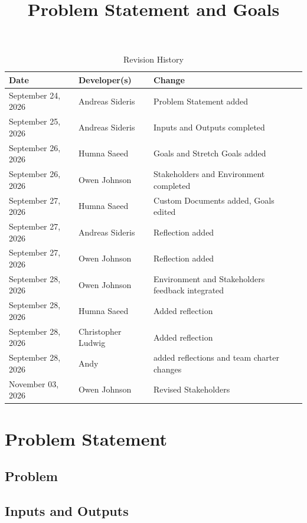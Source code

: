 \documentclass{article}
\title{Problem Statement and Goals\\\progname}
\author{\authname}
\date{}
\begin{document}
\maketitle

\begin{table}[hp]
\caption{Revision History} \label{TblRevisionHistory}
\begin{tabularx}{\textwidth}{llX}
\toprule
\textbf{Date} & \textbf{Developer(s)} & \textbf{Change}\\
\midrule
September 24, 2026 & Andreas Sideris & Problem Statement added\\
September 25, 2026 & Andreas Sideris & Inputs and Outputs completed\\
September 26, 2026 & Humna Saeed & Goals and Stretch Goals added\\
September 26, 2026 & Owen Johnson & Stakeholders and Environment completed\\
September 27, 2026 & Humna Saeed & Custom Documents added, Goals edited \\
September 27, 2026 & Andreas Sideris & Reflection added \\
September 27, 2026 & Owen Johnson & Reflection added \\
September 28, 2026 & Owen Johnson & Environment and Stakeholders feedback 
integrated\\
September 28, 2026 & Humna Saeed & Added reflection \\
September 28, 2026 & Christopher Ludwig & Added reflection \\
September 28, 2026 & Andy & added reflections and team charter changes \\
November 03, 2026 & Owen Johnson & Revised Stakeholders \\
\bottomrule
\end{tabularx}
\end{table}

\section{Problem Statement} 

\subsection{Problem}



\subsection{Inputs and Outputs}
\end{document}
